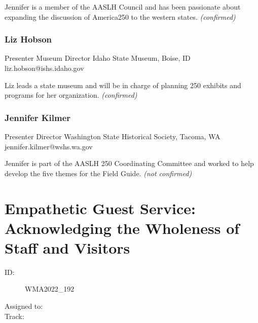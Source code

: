 \documentclass{report}
\begin{document}
                

                Jennifer is a member of the AASLH Council and has been passionate about expanding the discussion of America250 to the western states.
                \emph{ (confirmed) }
              

              
                \subsubsection*{ Liz Hobson }
                Presenter\newline
                Museum Director\newline
                Idaho State Museum, Boise, ID
                \newline
                liz.hobson@ishs.idaho.gov\newline
                
                

                Liz leads a state museum and will be in charge of planning 250 exhibits and programs for her organization.
                \emph{ (confirmed) }
              

              
                \subsubsection*{ Jennifer Kilmer }
                Presenter\newline
                Director\newline
                Washington State Historical Society, Tacoma, WA
                \newline
                jennifer.kilmer@wshs.wa.gov\newline
                
                

                Jennifer is part of the AASLH 250 Coordinating Committee and worked to help develop the five themes for the Field Guide.
                \emph{ (not confirmed) }
              

              
        
          \newpage
          \section{ Empathetic Guest Service: Acknowledging the Wholeness of Staff and Visitors }
            \begin{description}
              \item [ID:]
              WMA2022\_192

              \item [Assigned to:]
                \item [Track:]
              \end{description}
\end{document}
